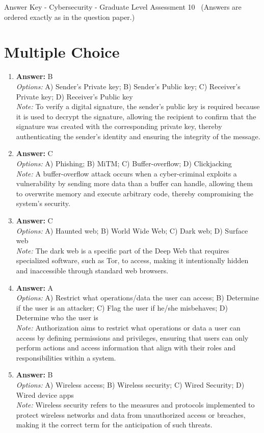 \documentclass[12pt]{article}
\begin{document}
\begin{center}
Answer Key - Cybersecurity - Graduate Level Assessment 10 \
\small (Answers are ordered exactly as in the question paper.)
\end{center}

\section*{Multiple Choice}
\begin{enumerate}[label=\arabic*.]
\item \textbf{Answer:} B
\\ \textit{Options:} A) Sender's Private key; B) Sender's Public key; C) Receiver's Private key; D) Receiver's Public key
\\ \textit{Note:} To verify a digital signature, the sender's public key is required because it is used to decrypt the signature, allowing the recipient to confirm that the signature was created with the corresponding private key, thereby authenticating the sender's identity and ensuring the integrity of the message.
\item \textbf{Answer:} C
\\ \textit{Options:} A) Phishing; B) MiTM; C) Buffer-overflow; D) Clickjacking
\\ \textit{Note:} A buffer-overflow attack occurs when a cyber-criminal exploits a vulnerability by sending more data than a buffer can handle, allowing them to overwrite memory and execute arbitrary code, thereby compromising the system's security.
\item \textbf{Answer:} C
\\ \textit{Options:} A) Haunted web; B) World Wide Web; C) Dark web; D) Surface web
\\ \textit{Note:} The dark web is a specific part of the Deep Web that requires specialized software, such as Tor, to access, making it intentionally hidden and inaccessible through standard web browsers.
\item \textbf{Answer:} A
\\ \textit{Options:} A) Restrict what operations/data the user can access; B) Determine if the user is an attacker; C) Flag the user if he/she misbehaves; D) Determine who the user is
\\ \textit{Note:} Authorization aims to restrict what operations or data a user can access by defining permissions and privileges, ensuring that users can only perform actions and access information that align with their roles and responsibilities within a system.
\item \textbf{Answer:} B
\\ \textit{Options:} A) Wireless access; B) Wireless security; C) Wired Security; D) Wired device apps
\\ \textit{Note:} Wireless security refers to the measures and protocols implemented to protect wireless networks and data from unauthorized access or breaches, making it the correct term for the anticipation of such threats.
\end{enumerate}
\end{document}
